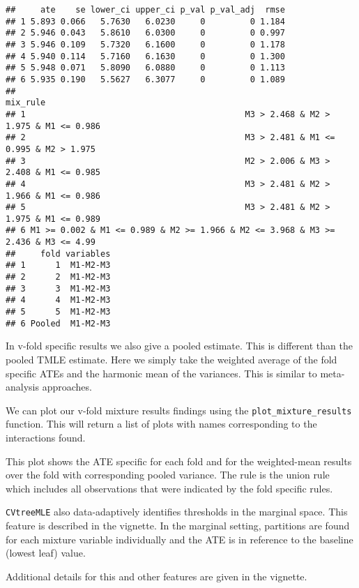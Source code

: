 \documentclass[
]{article}
\newenvironment{Shaded}{\begin{snugshade}}{\end{snugshade}}
\newcommand{\AttributeTok}[1]{\textcolor[rgb]{0.77,0.63,0.00}{#1}}
\newcommand{\NormalTok}[1]{#1}
\newcommand{\OtherTok}[1]{\textcolor[rgb]{0.56,0.35,0.01}{#1}}
\newcommand{\SpecialCharTok}[1]{\textcolor[rgb]{0.00,0.00,0.00}{#1}}
\newcommand{\StringTok}[1]{\textcolor[rgb]{0.31,0.60,0.02}{#1}}
\begin{document}
\begin{Shaded}
\end{Shaded}

\begin{verbatim}
##     ate    se lower_ci upper_ci p_val p_val_adj  rmse
## 1 5.893 0.066   5.7630   6.0230     0         0 1.184
## 2 5.946 0.043   5.8610   6.0300     0         0 0.997
## 3 5.946 0.109   5.7320   6.1600     0         0 1.178
## 4 5.940 0.114   5.7160   6.1630     0         0 1.300
## 5 5.948 0.071   5.8090   6.0880     0         0 1.113
## 6 5.935 0.190   5.5627   6.3077     0         0 1.089
##                                                                           mix_rule
## 1                                            M3 > 2.468 & M2 > 1.975 & M1 <= 0.986
## 2                                            M3 > 2.481 & M1 <= 0.995 & M2 > 1.975
## 3                                            M2 > 2.006 & M3 > 2.408 & M1 <= 0.985
## 4                                            M3 > 2.481 & M2 > 1.966 & M1 <= 0.986
## 5                                            M3 > 2.481 & M2 > 1.975 & M1 <= 0.989
## 6 M1 >= 0.002 & M1 <= 0.989 & M2 >= 1.966 & M2 <= 3.968 & M3 >= 2.436 & M3 <= 4.99
##     fold variables
## 1      1  M1-M2-M3
## 2      2  M1-M2-M3
## 3      3  M1-M2-M3
## 4      4  M1-M2-M3
## 5      5  M1-M2-M3
## 6 Pooled  M1-M2-M3
\end{verbatim}

In v-fold specific results we also give a pooled estimate. This is
different than the pooled TMLE estimate. Here we simply take the
weighted average of the fold specific ATEs and the harmonic mean of the
variances. This is similar to meta-analysis approaches.

We can plot our v-fold mixture results findings using the
\texttt{plot\_mixture\_results} function. This will return a list of
plots with names corresponding to the interactions found.

This plot shows the ATE specific for each fold and for the weighted-mean
results over the fold with corresponding pooled variance. The rule is
the union rule which includes all observations that were indicated by
the fold specific rules.

\texttt{CVtreeMLE} also data-adaptively identifies thresholds in the
marginal space. This feature is described in the vignette. In the
marginal setting, partitions are found for each mixture variable
individually and the ATE is in reference to the baseline (lowest leaf)
value.

Additional details for this and other features are given in the
vignette.
\end{document}
